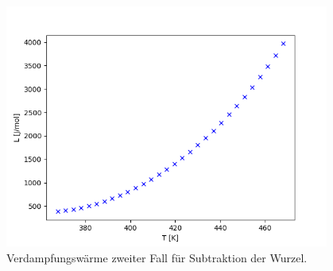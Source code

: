 \begin{figure}[H]
    \centering
    \includegraphics[height=80mm]{bilder/plot4.png}
    \caption{Verdampfungswärme zweiter Fall für Subtraktion der Wurzel.\label{Abbildung8} }
\end{figure}